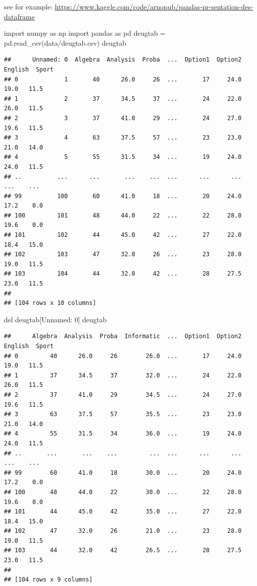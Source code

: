\documentclass[
  10pt,
]{article}
\newenvironment{Shaded}{\begin{snugshade}}{\end{snugshade}}
\newcommand{\NormalTok}[1]{#1}
\begin{document}
see for example:
\url{https://www.kaggle.com/code/arnopub/pandas-pr-sentation-des-dataframe}

\begin{Shaded}
\begin{Highlighting}[]
\NormalTok{import numpy as np }
\NormalTok{import pandas as pd}
\NormalTok{deugtab = pd.read\_csv(\textquotesingle{}data/deugtab.csv\textquotesingle{})}
\NormalTok{deugtab}
\end{Highlighting}
\end{Shaded}

\begin{verbatim}
##      Unnamed: 0  Algebra  Analysis  Proba  ...  Option1  Option2  English  Sport
## 0             1       40      26.0     26  ...       17     24.0     19.0   11.5
## 1             2       37      34.5     37  ...       24     22.0     26.0   11.5
## 2             3       37      41.0     29  ...       24     27.0     19.6   11.5
## 3             4       63      37.5     57  ...       23     23.0     21.0   14.0
## 4             5       55      31.5     34  ...       19     24.0     24.0   11.5
## ..          ...      ...       ...    ...  ...      ...      ...      ...    ...
## 99          100       60      41.0     18  ...       20     24.0     17.2    0.0
## 100         101       48      44.0     22  ...       22     28.0     19.6    0.0
## 101         102       44      45.0     42  ...       27     22.0     18.4   15.0
## 102         103       47      32.0     26  ...       23     28.0     19.0   11.5
## 103         104       44      32.0     42  ...       28     27.5     23.0   11.5
## 
## [104 rows x 10 columns]
\end{verbatim}

\begin{Shaded}
\begin{Highlighting}[]
\NormalTok{del deugtab[\textquotesingle{}Unnamed: 0\textquotesingle{}]}
\NormalTok{deugtab}
\end{Highlighting}
\end{Shaded}

\begin{verbatim}
##      Algebra  Analysis  Proba  Informatic  ...  Option1  Option2  English  Sport
## 0         40      26.0     26        26.0  ...       17     24.0     19.0   11.5
## 1         37      34.5     37        32.0  ...       24     22.0     26.0   11.5
## 2         37      41.0     29        34.5  ...       24     27.0     19.6   11.5
## 3         63      37.5     57        35.5  ...       23     23.0     21.0   14.0
## 4         55      31.5     34        36.0  ...       19     24.0     24.0   11.5
## ..       ...       ...    ...         ...  ...      ...      ...      ...    ...
## 99        60      41.0     18        30.0  ...       20     24.0     17.2    0.0
## 100       48      44.0     22        30.0  ...       22     28.0     19.6    0.0
## 101       44      45.0     42        35.0  ...       27     22.0     18.4   15.0
## 102       47      32.0     26        21.0  ...       23     28.0     19.0   11.5
## 103       44      32.0     42        26.5  ...       28     27.5     23.0   11.5
## 
## [104 rows x 9 columns]
\end{verbatim}
\end{document}
